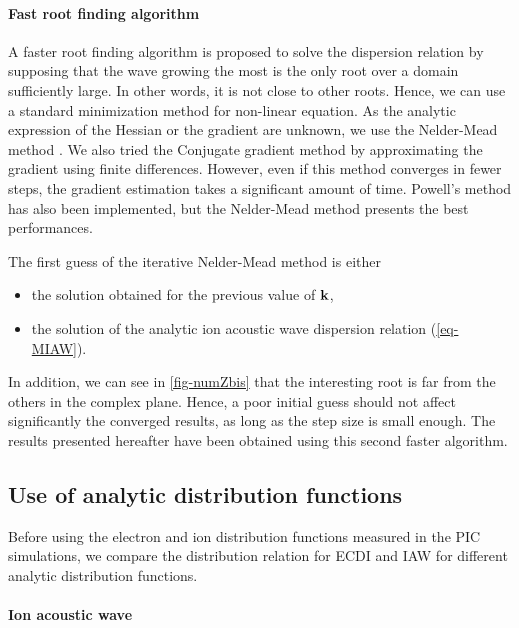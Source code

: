   \paragraph{Fast root finding algorithm\\}
    A faster root finding algorithm is proposed to solve the dispersion relation by supposing that the wave growing the most is the only root over a domain sufficiently large.
    In other words, it is not close to other roots.
    Hence, we can use a standard minimization method for non-linear equation.
    As the analytic expression of the Hessian or the gradient are unknown, we use the Nelder-Mead method \citep{mckinnon1998}.
    We also tried the Conjugate gradient method by approximating the gradient using finite differences. 
    However, even if this method converges in fewer steps, the gradient estimation takes a significant amount of time.
    Powell's method \citep{powell1964} has also been implemented, but the Nelder-Mead method presents the best performances.
    
    The first guess of the iterative Nelder-Mead method is either 
    \begin{itemize}
      \item the solution obtained for the previous value of ${\mathbf k}$, 
      \item the solution of the analytic ion acoustic wave dispersion relation (\cref{eq-MIAW}).
    \end{itemize}
    In addition, we can see in \cref{fig-numZbis} that the interesting root is far from the others in the complex plane.
    Hence, a poor initial guess should not affect significantly the converged results, as long as the step size is small enough.
    The results presented hereafter have been obtained using this second faster algorithm.
    

    \FloatBarrier

\subsection{Use of analytic distribution functions} \label{subsec-DRimpact}
  Before using the electron and ion distribution functions measured in the \ac{PIC} simulations, we compare the distribution relation for \ac{ECDI} and \ac{IAW} for different analytic distribution functions.
  
  \paragraph{Ion acoustic wave\\}
  
